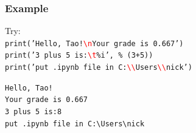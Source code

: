 \documentclass[11pt]{beamer}
\begin{document}
\begin{frame}[fragile]
  \frametitle{Example}
  \Enlarge

  \hspace{10mm}Try: \\
  \hspace{12mm}\texttt{\small print('Hello, Tao!\texttt{\textcolor{red}{\textbackslash n}}Your grade is 0.667') \\
  \hspace{12mm}print('3 plus 5 is:\texttt{\textcolor{red}{\textbackslash t}}\%i', \% (3+5)) \\
  \hspace{12mm}print('put .ipynb file in C:\texttt{\textcolor{red}{\textbackslash \textbackslash}}Users\texttt{\textcolor{red}{\textbackslash \textbackslash}}nick')} 
  
  \vspace{3mm}
  \hspace{12mm}\texttt{\small \textcolor{CS101GradBot}{Hello, Tao!\\
  \hspace{12mm}Your grade is 0.667 \\\vspace{1mm}\pause
  \hspace{12mm}3 plus 5 is:\hspace{5mm}8\\\vspace{1mm}\pause
   \hspace{12mm}put .ipynb file in C:\textbackslash Users\textbackslash nick}}
\end{frame}

\end{document}

